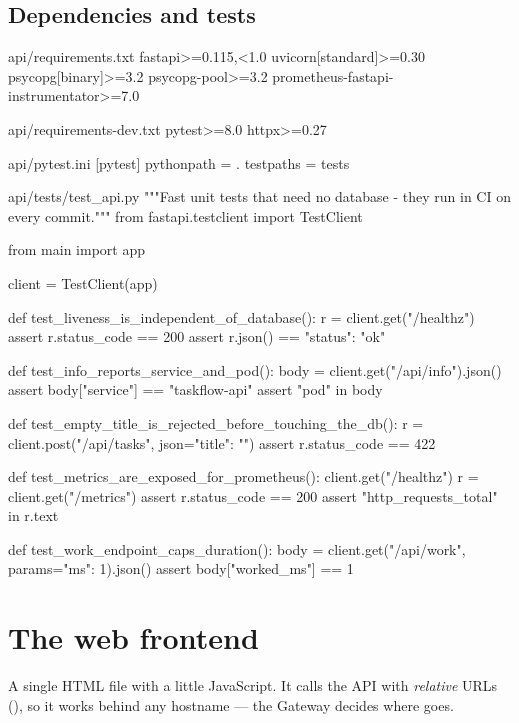 \subsection{Dependencies and tests}

\begin{plaincode}{api/requirements.txt}
fastapi>=0.115,<1.0
uvicorn[standard]>=0.30
psycopg[binary]>=3.2
psycopg-pool>=3.2
prometheus-fastapi-instrumentator>=7.0
\end{plaincode}

\begin{plaincode}{api/requirements-dev.txt}
pytest>=8.0
httpx>=0.27
\end{plaincode}

\begin{plaincode}{api/pytest.ini}
[pytest]
pythonpath = .
testpaths = tests
\end{plaincode}

\begin{pycode}{api/tests/test_api.py}
"""Fast unit tests that need no database - they run in CI on every commit."""
from fastapi.testclient import TestClient

from main import app

client = TestClient(app)


def test_liveness_is_independent_of_database():
    r = client.get("/healthz")
    assert r.status_code == 200
    assert r.json() == {"status": "ok"}


def test_info_reports_service_and_pod():
    body = client.get("/api/info").json()
    assert body["service"] == "taskflow-api"
    assert "pod" in body


def test_empty_title_is_rejected_before_touching_the_db():
    r = client.post("/api/tasks", json={"title": ""})
    assert r.status_code == 422


def test_metrics_are_exposed_for_prometheus():
    client.get("/healthz")
    r = client.get("/metrics")
    assert r.status_code == 200
    assert "http_requests_total" in r.text


def test_work_endpoint_caps_duration():
    body = client.get("/api/work", params={"ms": 1}).json()
    assert body["worked_ms"] == 1
\end{pycode}

\section{The web frontend}

A single HTML file with a little JavaScript. It calls the API with
\emph{relative} URLs (), so it works behind any hostname --- the
Gateway decides where  goes.

